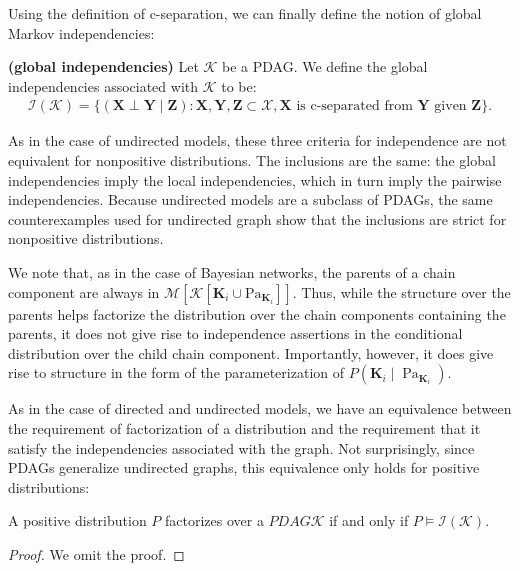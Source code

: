 \documentclass{article}
\newcommand{\bfs}[1]{\textbf{({#1}) }}
\begin{document}
  Using the definition of c-separation, we can finally define the notion of global Markov independencies:
  \begin{defa}\bfs{global independencies}
  Let $\mathcal{K}$ be a PDAG. We define the global independencies associated with $\mathcal{K}$  to be:
\begin{align*}
\mathcal{I}(\mathcal{K})=\{(\boldsymbol{X} \perp \boldsymbol{Y} \mid \boldsymbol{Z}): \boldsymbol{X}, \boldsymbol{Y}, \boldsymbol{Z} \subset \mathcal{X}, \boldsymbol{X} \text { is c-separated from } \boldsymbol{Y} \text { given } \boldsymbol{Z}\} .
\end{align*}
  \end{defa}

As in the case of undirected models, these three criteria for independence are not equivalent for nonpositive distributions. The inclusions are the same: the global independencies imply the local independencies, which in turn imply the pairwise independencies. Because undirected models are a subclass of PDAGs, the same counterexamples used for undirected graph show that the inclusions are strict for nonpositive distributions. 



We note that, as in the case of Bayesian networks, the parents of a chain component are always  in $\mathcal{M}\left[\mathcal{K}\left[\boldsymbol{K}_{i} \cup \mathrm{Pa}_{\boldsymbol{K}_{i}}\right]\right]$. Thus, while the structure over the parents helps factorize the distribution over the chain components containing the parents, it does not give rise to independence assertions in the conditional distribution over the child chain component. Importantly, however, it does give rise to structure in the form of the parameterization of $P\left(\boldsymbol{K}_{i} \mid \operatorname{Pa}_{\boldsymbol{K}_{i}}\right)$.

As in the case of directed and undirected models, we have an equivalence between the requirement of factorization of a distribution and the requirement that it satisfy the independencies associated with the graph. Not surprisingly, since PDAGs generalize undirected graphs, this equivalence only holds for positive distributions:
\begin{thma}
A positive distribution $P$ factorizes over a $P D A G \mathcal{K}$ if and only if $P \models \mathcal{I}(\mathcal{K})$.
\end{thma}
\begin{proof}
We omit the proof.
\end{proof}
\end{document}
